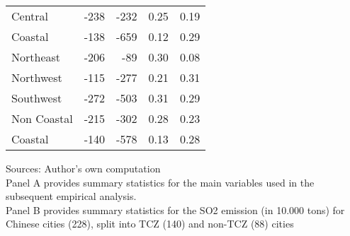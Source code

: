 \documentclass[12pt]{article}
\begin{document}
\begin{table}[!htbp]
\begin{adjustbox}{width=\textwidth, totalheight=\baselineskip,keepaspectratio}
\begin{tabular}{lrrrr}
      Central     &    -238 & -232 &     0.25 & 0.19 \\
      Coastal     &    -138 & -659 &     0.12 & 0.29 \\
      Northeast   &    -206 &  -89 &     0.30 & 0.08 \\
      Northwest   &    -115 & -277 &     0.21 & 0.31 \\
      Southwest   &    -272 & -503 &     0.31 & 0.29 \\
      Non Coastal &    -215 & -302 &     0.28 & 0.23 \\
      Coastal     &    -140 & -578 &     0.13 & 0.28 \\
      \bottomrule
      \hline
    \end{tabular}
    \end{adjustbox}
    \begin{tablenotes}
      \small
      \item 
      Sources: Author's own computation \\
      Panel A provides summary statistics for the main variables used in the subsequent empirical analysis. \\
  Panel B provides summary statistics for the SO2 emission (in 10.000 tons) for Chinese cities (228), split into TCZ (140) and non-TCZ (88) cities
      \\
    \end{tablenotes}
\end{table}
\end{document}
